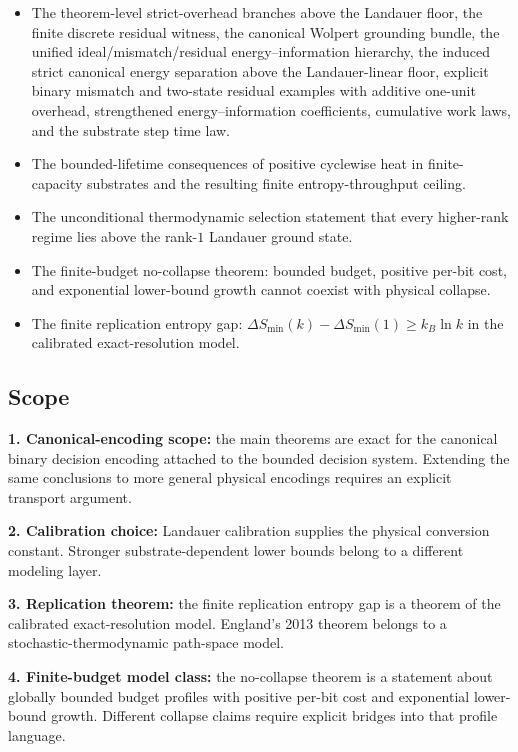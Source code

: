 \begin{itemize}
\item The theorem-level strict-overhead branches above the Landauer floor, the finite discrete residual witness, the canonical Wolpert grounding bundle, the unified ideal/mismatch/residual energy--information hierarchy, the induced strict canonical energy separation above the Landauer-linear floor, explicit binary mismatch and two-state residual examples with additive one-unit overhead, strengthened energy--information coefficients, cumulative work laws, and the substrate step time law.
\item The bounded-lifetime consequences of positive cyclewise heat in finite-capacity substrates and the resulting finite entropy-throughput ceiling.
\item The unconditional thermodynamic selection statement that every higher-rank regime lies above the rank-$1$ Landauer ground state.
\item The finite-budget no-collapse theorem: bounded budget, positive per-bit cost, and exponential lower-bound growth cannot coexist with physical collapse.
\item The finite replication entropy gap: $\Delta S_{\min}(k) - \Delta S_{\min}(1) \geq k_B \ln k$ in the calibrated exact-resolution model.
\end{itemize}

\subsection{Scope}

\textbf{1. Canonical-encoding scope:} the main theorems are exact for the canonical binary decision encoding attached to the bounded decision system. Extending the same conclusions to more general physical encodings requires an explicit transport argument.

\textbf{2. Calibration choice:} Landauer calibration supplies the physical conversion constant. Stronger substrate-dependent lower bounds belong to a different modeling layer.

\textbf{3. Replication theorem:} the finite replication entropy gap is a theorem of the calibrated exact-resolution model. England's 2013 theorem belongs to a stochastic-thermodynamic path-space model.

\textbf{4. Finite-budget model class:} the no-collapse theorem is a statement about globally bounded budget profiles with positive per-bit cost and exponential lower-bound growth. Different collapse claims require explicit bridges into that profile language.

